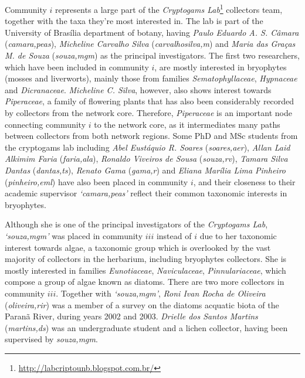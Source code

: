Community $i$ represents a large part of the \textit{Cryptogams Lab}\footnote{\url{http://labcriptounb.blogspot.com.br/}} collectors team, together with the taxa they're most interested in. 
The lab is part of the University of Brasília department of botany, having \textit{Paulo Eduardo A. S. Câmara} (\textit{camara,peas}), \textit{Micheline Carvalho Silva} (\textit{carvalhosilva,m}) and \textit{Maria das Graças M. de Souza} (\textit{souza,mgm}) as the principal investigators. 
%
The first two researchers, which have been included in community $i$, are mostly interested in bryophytes (mosses and liverworts), mainly those from families \textit{Sematophyllaceae}, \textit{Hypnaceae} and \textit{Dicranaceae}.
\textit{Micheline C. Silva}, however, also shows interest towards \textit{Piperaceae}, a family of flowering plants that has also been considerably recorded by collectors from the network core. 
Therefore, \textit{Piperaceae} is an important node connecting community $i$ to the network core, as it intermediates many paths between collectors from both network regions.
%
Some PhD and MSc students from the cryptogams lab including \textit{Abel Eustáquio R. Soares} (\textit{soares,aer}), \textit{Allan Laid Alkimim Faria} (\textit{faria,ala}), \textit{Ronaldo Viveiros de Sousa} (\textit{souza,rv}), \textit{Tamara Silva Dantas} (\textit{dantas,ts}), \textit{Renato Gama} (\textit{gama,r}) and \textit{Eliana Marília Lima Pinheiro} (\textit{pinheiro,eml}) have also been placed in community $i$, and their closeness to their academic supervisor \textit{`camara,peas'} reflect their common taxonomic interests in bryophytes.

Although she is one of the principal investigators of the \textit{Cryptogams Lab}, \textit{`souza,mgm'} was placed in community $iii$ instead of $i$ due to her taxonomic interest towards algae, a taxonomic group which is overlooked by the vast majority of collectors in the herbarium, including bryophytes collectors. 
She is mostly interested in families \textit{Eunotiaceae}, \textit{Naviculaceae}, \textit{Pinnulariaceae}, which compose a group of algae known as diatoms.
There are two more collectors in community $iii$.
Together with \textit{`souza,mgm'}, \textit{Roni Ivan Rocha de Oliveira} (\textit{oliveira,rir}) was a member of a survey on the diatoms acquatic biota of the Paranã River, during years 2002 and 2003.
\textit{Drielle dos Santos Martins} (\textit{martins,ds}) was an undergraduate student and a lichen collector, having been supervised by \textit{souza,mgm}.

